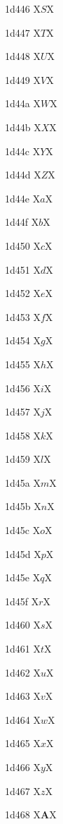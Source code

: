 \documentclass[11pt]{article}
\begin{document}
1d446 X{\ensuremath{\mathit{S}}}X

1d447 X{\ensuremath{\mathit{T}}}X

1d448 X{\ensuremath{\mathit{U}}}X

1d449 X{\ensuremath{\mathit{V}}}X

1d44a X{\ensuremath{\mathit{W}}}X

1d44b X{\ensuremath{\mathit{X}}}X

1d44c X{\ensuremath{\mathit{Y}}}X

1d44d X{\ensuremath{\mathit{Z}}}X

1d44e X{\ensuremath{\mathit{a}}}X

1d44f X{\ensuremath{\mathit{b}}}X

1d450 X{\ensuremath{\mathit{c}}}X

1d451 X{\ensuremath{\mathit{d}}}X

1d452 X{\ensuremath{\mathit{e}}}X

1d453 X{\ensuremath{\mathit{f}}}X

1d454 X{\ensuremath{\mathit{g}}}X

1d455 X{\ensuremath{\mathit{h}}}X

1d456 X{\ensuremath{\mathit{i}}}X

1d457 X{\ensuremath{\mathit{j}}}X

1d458 X{\ensuremath{\mathit{k}}}X

1d459 X{\ensuremath{\mathit{l}}}X

1d45a X{\ensuremath{\mathit{m}}}X

1d45b X{\ensuremath{\mathit{n}}}X

1d45c X{\ensuremath{\mathit{o}}}X

1d45d X{\ensuremath{\mathit{p}}}X

1d45e X{\ensuremath{\mathit{q}}}X

1d45f X{\ensuremath{\mathit{r}}}X

1d460 X{\ensuremath{\mathit{s}}}X

1d461 X{\ensuremath{\mathit{t}}}X

1d462 X{\ensuremath{\mathit{u}}}X

1d463 X{\ensuremath{\mathit{v}}}X

1d464 X{\ensuremath{\mathit{w}}}X

1d465 X{\ensuremath{\mathit{x}}}X

1d466 X{\ensuremath{\mathit{y}}}X

1d467 X{\ensuremath{\mathit{z}}}X

1d468 X{\ensuremath{\boldsymbol{A}}}X
\end{document}
